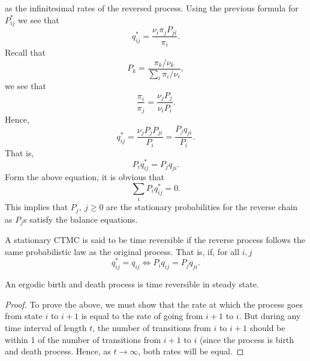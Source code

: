 \documentclass[a4paper,10pt]{article}
\begin{document}
as the infinitesimal rates of the reversed process. Using the previous formula for $P_{ij}^*$ we see that
\begin{equation}
q_{ij}^*=\frac{\nu_i\pi_jP_{ji}}{\pi_i}.
\end{equation} 
Recall that 
\begin{equation}
P_{k}=\frac{\pi_k / \nu_k}{\sum_{i}\pi_i / \nu_i},
\end{equation}
we see that 
\begin{equation}
\frac{\pi_i}{\pi_j}=\frac{\nu_j P_j}{\nu_i P_i}.
\end{equation}
Hence, 
\begin{equation}
q_{ij}^*=\frac{\nu_j P_{j}P_{ji}}{P_i}= \frac{P_jq_{ji}}{P_i}.
\end{equation}
That is,
\begin{equation*}
P_{i}q_{ij}^*=P_{j}q_{ji}.
\end{equation*}
Form the above equation, it is obvious that 
\begin{equation*}
\sum_{i}P_i q_{ij}^*=0.
\end{equation*} 
This implies that $P_j,~j \geq 0$ are the stationary probabilities for the reverse chain as $P_j$s satisfy the balance equations.
\begin{defn}
A stationary CTMC is said to be time reversible if the reverse process follows the same probabilistic law as the original process. That is, if, for all $i,j$
\begin{equation*}
q_{ij}^*= q_{ij} \iff P_{i}q_{ij}=P_jq_{ji}.
\end{equation*} 
\end{defn} 
\begin{prop}
An ergodic birth and death process is time reversible in steady state.
\end{prop}
\begin{proof}
To prove the above, we must show that the rate at which the process goes from state $i$ to $i+1$ is equal to the rate of going from $i+1$ to $i$. But during any time interval of length $t$, the number of transitions from $i$ to $i+1$ should be within 1 of the number of transitions from $i+1$ to $i$ (since the process is birth and death process. Hence, as $t \rightarrow \infty$,  both rates will be equal. 
\end{proof}
\end{document}
